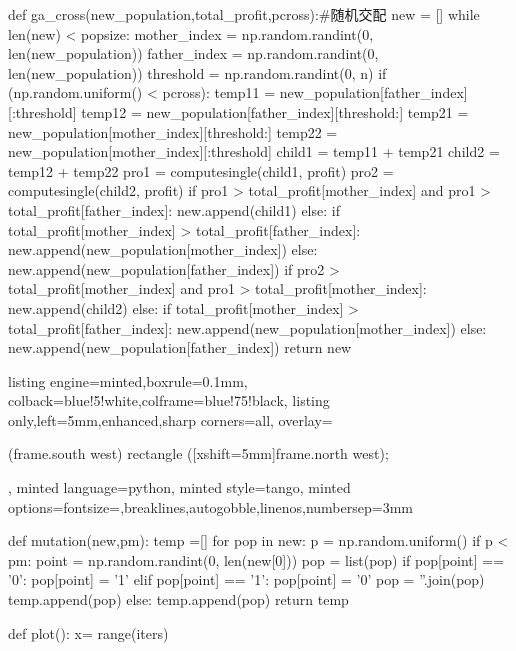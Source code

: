 \documentclass{article}
\begin{document}
\begin{homeworkProblem}
\begin{tcblisting}
def ga_cross(new_population,total_profit,pcross):#随机交配
    new = []
    while len(new) < popsize:
        mother_index = np.random.randint(0, len(new_population))
        father_index = np.random.randint(0, len(new_population))
        threshold = np.random.randint(0, n)
        if (np.random.uniform() < pcross):
            temp11 = new_population[father_index][:threshold]
            temp12 = new_population[father_index][threshold:]
            temp21 = new_population[mother_index][threshold:]
            temp22 = new_population[mother_index][:threshold]
            child1 = temp11 + temp21
            child2 = temp12 + temp22
            pro1 = computesingle(child1, profit)
            pro2 = computesingle(child2, profit)
            if pro1 > total_profit[mother_index] and pro1 > total_profit[father_index]:
                new.append(child1)
            else:
                if total_profit[mother_index] > total_profit[father_index]:
                    new.append(new_population[mother_index])
                else:
                    new.append(new_population[father_index])
            if pro2 > total_profit[mother_index] and pro1 > total_profit[mother_index]:
                new.append(child2)
            else:
                if total_profit[mother_index] > total_profit[father_index]:
                    new.append(new_population[mother_index])
                else:
                    new.append(new_population[father_index])
    return new
\end{tcblisting}
\begin{tcblisting}{listing engine=minted,boxrule=0.1mm,
colback=blue!5!white,colframe=blue!75!black,
listing only,left=5mm,enhanced,sharp corners=all,
overlay={\begin{tcbclipinterior} (frame.south west)
rectangle ([xshift=5mm]frame.north west);\end{tcbclipinterior}},
minted language=python,
minted style=tango,
minted options={fontsize=\small,breaklines,autogobble,linenos,numbersep=3mm}}
def mutation(new,pm):
    temp =[]
    for pop in new:
        p = np.random.uniform()
        if p < pm:
            point = np.random.randint(0, len(new[0]))
            pop = list(pop)
            if pop[point] == '0':
                pop[point] = '1'
            elif pop[point] == '1':
                pop[point] = '0'
            pop = ''.join(pop)
            temp.append(pop)
        else:
            temp.append(pop)
    return temp
 
def plot():
    x= range(iters)
 

\end{tcblisting}
\end{homeworkProblem}
\end{document}
